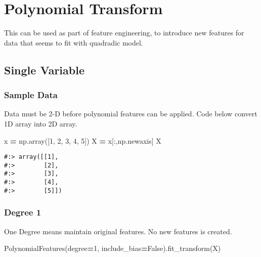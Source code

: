 \documentclass[
]{book}
\newenvironment{Shaded}{\begin{snugshade}}{\end{snugshade}}
\newcommand{\DecValTok}[1]{\textcolor[rgb]{0.06,0.06,0.06}{#1}}
\newcommand{\NormalTok}[1]{#1}
\newcommand{\OperatorTok}[1]{\textcolor[rgb]{0.43,0.43,0.43}{\textbf{#1}}}
\newcommand{\VariableTok}[1]{\textcolor[rgb]{0,0,0}{#1}}
\begin{document}
\hypertarget{polynomial-transform}{%
\section{Polynomial Transform}\label{polynomial-transform}}

This can be used as part of feature engineering, to introduce new features for data that seems to fit with quadradic model.

\hypertarget{single-variable}{%
\subsection{Single Variable}\label{single-variable}}

\hypertarget{sample-data-21}{%
\subsubsection{Sample Data}\label{sample-data-21}}

Data must be 2-D before polynomial features can be applied. Code below convert 1D array into 2D array.

\begin{Shaded}
\begin{Highlighting}[]
\NormalTok{x }\OperatorTok{=}\NormalTok{ np.array([}\DecValTok{1}\NormalTok{, }\DecValTok{2}\NormalTok{, }\DecValTok{3}\NormalTok{, }\DecValTok{4}\NormalTok{, }\DecValTok{5}\NormalTok{])}
\NormalTok{X }\OperatorTok{=}\NormalTok{ x[:,np.newaxis]}
\NormalTok{X}
\end{Highlighting}
\end{Shaded}

\begin{verbatim}
#:> array([[1],
#:>        [2],
#:>        [3],
#:>        [4],
#:>        [5]])
\end{verbatim}

\hypertarget{degree-1}{%
\subsubsection{Degree 1}\label{degree-1}}

One Degree means maintain original features. No new features is created.

\begin{Shaded}
\begin{Highlighting}[]
\NormalTok{PolynomialFeatures(degree}\OperatorTok{=}\DecValTok{1}\NormalTok{, include\_bias}\OperatorTok{=}\VariableTok{False}\NormalTok{).fit\_transform(X)}
\end{Highlighting}
\end{Shaded}
\end{document}
